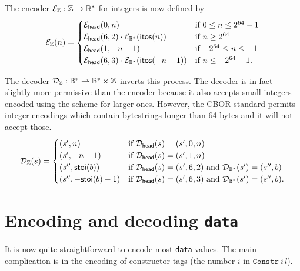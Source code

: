 \noindent
The encoder $\mathcal{E}_{\mathbb{Z}}: \mathbb{Z} \rightarrow \mathbb{B}^*$ for integers is now defined by
$$ \mathcal{E}_{\mathbb{Z}}(n) =
\begin{cases}
  \mathcal{E}_{\mathsf{head}}(0,n)                             & \text{if $0\leq n \leq 2^{64}-1$}\\
  \mathcal{E}_{\mathsf{head}}(6,2) \cdot \mathcal{E}_{\mathbb{B}^*}(\mathsf{itos}(n))    & \text{if $n \geq 2^{64}$}\\
  \mathcal{E}_{\mathsf{head}}(1,-n-1)                          & \text{if $-2^{64} \leq n \leq -1$}\\
  \mathcal{E}_{\mathsf{head}}(6,3) \cdot \mathcal{E}_{\mathbb{B}^*}(\mathsf{itos}(-n-1)) & \text{if $n \leq -2^{64}-1$}.
\end{cases}
$$

\noindent The decoder $\mathcal{D}_{\mathbb{Z}}: \mathbb{B}^* \rightharpoonup \mathbb{B}^* \times \mathbb{Z}$ inverts this
process. The decoder is in fact slightly more permissive than the encoder
because it also accepts small integers encoded using the scheme for larger ones.
However, the CBOR standard permits integer encodings which contain bytestrings
longer than 64 bytes and it will not accept those.
$$ \mathcal{D}_{\mathbb{Z}}(s) =
\begin{cases}
  (s', n)               & \text{if $\mathcal{D}_{\mathsf{head}}(s) = (s', 0,n)$}\\
  (s', -n-1)            & \text{if $\mathcal{D}_{\mathsf{head}}(s) = (s', 1,n)$}\\
  (s'', \mathsf{stoi}(b))       & \text{if $\mathcal{D}_{\mathsf{head}}(s) = (s', 6,2)$ and $\mathcal{D}_{\mathbb{B}^*}(s') = (s'', b)$}\\
  (s'', -\mathsf{stoi}(b)-1)    & \text{if $\mathcal{D}_{\mathsf{head}}(s) = (s', 6,3)$ and $\mathcal{D}_{\mathbb{B}^*}(s') = (s'', b)$}.\\
\end{cases}
$$



\section{Encoding and decoding \texttt{data}}
\label{sec:encoding-data}
\newcommand\eData{\e_{\mathtt{data}}}
\newcommand\eDataStar{\e_{\mathtt{data^*}}}
\newcommand\eDataStarSq{\e_{\mathtt{(data^2)^*}}}

\newcommand\dData{\d_{\mathtt{data}}}
\newcommand\dDataStar{\d_{\mathtt{data^*}}}
\newcommand\dDataStarSq{\d_{\mathtt{(data^2)^*}}}

It is now quite straightforward to encode most \texttt{data} values.  The main
complication is in the encoding of constructor tags (the number $i$ in
$\mathtt{Constr}\: i\, l$).

